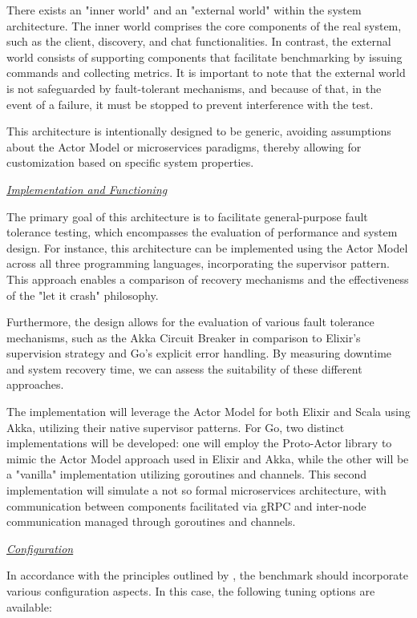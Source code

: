 There exists an "inner world" and an "external world" within the system architecture. The inner world comprises the core components of the real system, such as the client, discovery, and chat functionalities. In contrast, the external world consists of supporting components that facilitate benchmarking by issuing commands and collecting metrics. It is important to note that the external world is not safeguarded by fault-tolerant mechanisms, and because of that, in the event of a failure, it must be stopped to prevent interference with the test.

This architecture is intentionally designed to be generic, avoiding assumptions about the Actor Model or microservices paradigms, thereby allowing for customization based on specific system properties.

\textit{\underline{Implementation and Functioning}}

The primary goal of this architecture is to facilitate general-purpose fault tolerance testing, which encompasses the evaluation of performance and system design. For instance, this architecture can be implemented using the Actor Model across all three programming languages, incorporating the supervisor pattern. This approach enables a comparison of recovery mechanisms and the effectiveness of the "let it crash" philosophy.

Furthermore, the design allows for the evaluation of various fault tolerance mechanisms, such as the Akka Circuit Breaker in comparison to Elixir’s supervision strategy and Go's explicit error handling. By measuring downtime and system recovery time, we can assess the suitability of these different approaches.

The implementation will leverage the Actor Model for both Elixir and Scala using Akka, utilizing their native supervisor patterns. For Go, two distinct implementations will be developed: one will employ the Proto-Actor library to mimic the Actor Model approach used in Elixir and Akka, while the other will be a "vanilla" implementation utilizing goroutines and channels. This second implementation will simulate a not so formal microservices architecture, with communication between components facilitated via \gls{gRPC} and inter-node communication managed through goroutines and channels.

\textit{\underline{Configuration}}

In accordance with the principles outlined by \textcite{Blessing2019}, the benchmark should incorporate various configuration aspects. In this case, the following tuning options are available:

